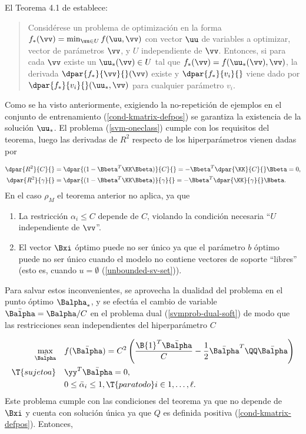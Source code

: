 El Teorema 4.1 de \cite{bonnans-shapiro} establece:

\begin{quote}
  Considérese un problema de optimización en la forma
  $f_*(\vv)=\min_{\uu\in{}U}f(\uu,\vv)$ con vector $\uu$ de variables a
  optimizar, vector de parámetros $\vv$, y $U$ independiente de
  $\vv$. Entonces, si para cada $\vv$ existe un $\uu_*(\vv)\in{}U$
  tal que $f_*(\vv)=f(\uu_*(\vv),\vv)$, la derivada
  $\dpar{f_*}{\vv}{}(\vv)$ existe y $\dpar{f_*}{v_i}{}$ viene dado por
  $\dpar{f_*}{v_i}{}(\uu_*,\vv)$ para cualquier parámetro $v_i$.
\end{quote}

Como se ha visto anteriormente, exigiendo la no-repetición de ejemplos
en el conjunto de entrenamiento (\ref{cond-kmatrix-defpos}) se
garantiza la existencia de la solución $\uu_*$.
El problema (\ref{svm-oneclass}) cumple con los requisitos del teorema,
luego las derivadas de $R^2$ respecto de los hiperparámetros vienen
dadas por

\begin{align}
  \dpar{R^2}{C}{} &= \dpar{(1-\Bbeta^T\KK\Bbeta)}{C}{}
  = -\Bbeta^T \dpar{\KK}{C}{}\Bbeta = 0, \\
  \dpar{R^2}{\gamma}{} &= \dpar{(1-\Bbeta^T\KK\Bbeta)}{\gamma}{}
  = -\Bbeta^T \dpar{\KK}{\gamma}{}\Bbeta.
\end{align}
En el caso $\rho_M$ el teorema anterior no aplica, ya que

\begin{enumerate}
\item La restricción $\alpha_i\leq{}C$ depende de $C$, violando la condición
  necesaria ``$U$ independiente de $\vv$''.
\item El vector $\Bxi$ óptimo puede no ser único ya que el parámetro $b$ óptimo
  puede no ser único cuando el modelo no contiene vectores de soporte
  ``libres'' (esto es, cuando $u=\emptyset$ (\ref{unbounded-sv-set})).
\end{enumerate}
Para salvar estos inconvenientes, se aprovecha la dualidad del
problema en el punto óptimo $\Balpha_*$, y se efectúa el cambio de
variable $\bar{\Balpha}=\Balpha/C$ en el problema dual
(\ref{svmprob-dual-soft}) de modo que las restricciones sean
independientes del hiperparámetro $C$

\begin{align}
\begin{split}
    \max_{\bar{\Balpha}}\quad&
    f(\bar{\Balpha}) = C^2 \left( \frac{\B{1}^T\bar{\Balpha}}{C}
    -\frac{1}{2}\bar{\Balpha}^T\QQ\bar{\Balpha}\right)\\
    \T{sujeto a}\quad & \yy^T\bar{\Balpha} = 0, \\
    & 0\leq\bar{\alpha}_i\leq 1,
    \T{ para todo } i\in {1,\ldots,\ell }.
\end{split}\end{align}
Este problema cumple con las condiciones del teorema ya que
no depende de $\Bxi$ y cuenta con solución única
ya que $Q$ es definida positiva (\ref{cond-kmatrix-defpos}). Entonces,

